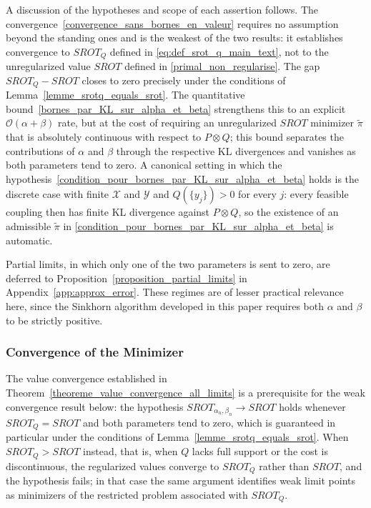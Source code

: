 \documentclass{article}
\begin{document}
A discussion of the hypotheses and scope of each assertion follows. The convergence~\eqref{convergence_sans_bornes_en_valeur} requires no assumption beyond the standing ones and is the weakest of the two results: it establishes convergence to $SROT_Q$ defined in \eqref{eq:def_srot_q_main_text}, not to the unregularized value $SROT$ defined in \eqref{primal_non_regularise}. The gap $SROT_Q - SROT$ closes to zero precisely under the conditions of Lemma~\ref{lemme_srotq_equals_srot}. The quantitative bound~\eqref{bornes_par_KL_sur_alpha_et_beta} strengthens this to an explicit $\mathcal{O}(\alpha + \beta)$ rate, but at the cost of requiring an unregularized $SROT$ minimizer $\tilde\pi$ that is absolutely continuous with respect to $P\otimes Q$; this bound separates the contributions of $\alpha$ and $\beta$ through the respective KL divergences and vanishes as both parameters tend to zero. A canonical setting in which the hypothesis~\eqref{condition_pour_bornes_par_KL_sur_alpha_et_beta} holds is the discrete case with finite $\mathcal{X}$ and $\mathcal{Y}$ and $Q(\{y_j\}) > 0$ for every $j$: every feasible coupling then has finite KL divergence against $P\otimes Q$, so the existence of an admissible $\tilde\pi$ in \eqref{condition_pour_bornes_par_KL_sur_alpha_et_beta} is automatic.

Partial limits, in which only one of the two parameters is sent to zero, are deferred to Proposition~\ref{proposition_partial_limits} in Appendix~\ref{app:approx_error}. These regimes are of lesser practical relevance here, since the Sinkhorn algorithm developed in this paper requires both $\alpha$ and $\beta$ to be strictly positive.
\subsubsection{Convergence of the Minimizer}

The value convergence established in Theorem~\ref{theoreme_value_convergence_all_limits}
is a prerequisite for the weak convergence result below: the hypothesis
$SROT_{\alpha_n,\beta_n} \to SROT$ holds whenever $SROT_Q = SROT$ and both parameters
tend to zero, which is guaranteed in particular under the conditions of
Lemma~\ref{lemme_srotq_equals_srot}. When $SROT_Q > SROT$ instead, that is, when $Q$
lacks full support or the cost is discontinuous, the regularized values converge to
$SROT_Q$ rather than $SROT$, and the hypothesis fails; in that case the same argument
identifies weak limit points as minimizers of the restricted problem associated with
$SROT_Q$.
\end{document}
